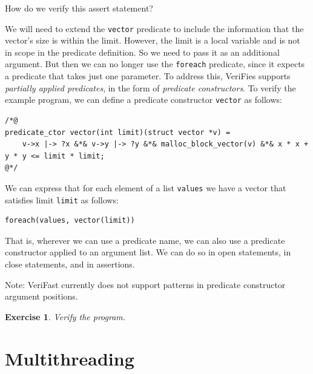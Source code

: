 \documentclass{article}
\newtheorem{exercise}{Exercise}
\begin{document}
How do we verify this assert statement?

We will need to extend the \lstinline!vector! predicate to
include the information that the vector's size is within the
limit. However, the limit is a local variable and is not in
scope in the predicate definition. So we need to pass it as an
additional argument. But then we can no longer use the
\lstinline!foreach! predicate, since it expects a predicate
that takes just one parameter. To address this, VeriFies
supports \emph{partially applied predicates}, in the form of
\emph{predicate constructors}. To verify the example program,
we can define a predicate constructor \lstinline!vector! as
follows:
\begin{lstlisting}
/*@
predicate_ctor vector(int limit)(struct vector *v) =
    v->x |-> ?x &*& v->y |-> ?y &*& malloc_block_vector(v) &*& x * x + y * y <= limit * limit;
@*/
\end{lstlisting}
We can express that for each element of a list
\lstinline!values! we have a vector that satisfies limit
\lstinline!limit! as follows:
\begin{lstlisting}
foreach(values, vector(limit))
\end{lstlisting}
That is, wherever we can use a predicate name, we can also use
a predicate constructor applied to an argument list. We can do
so in open statements, in close statements, and in assertions.

Note: VeriFast currently does not support patterns in predicate
constructor argument positions.

\begin{exercise}\label{exercise:predctors}
Verify the program.
\end{exercise}

\section{Multithreading}\label{section:multithreading}
\end{document}

